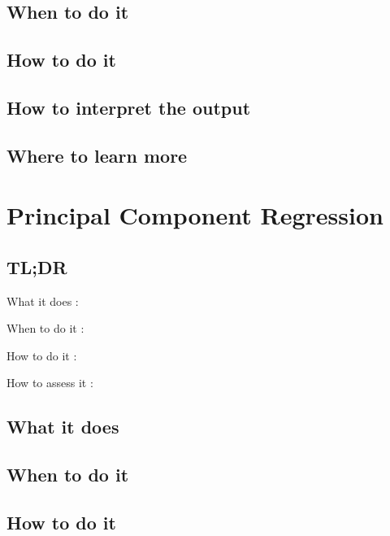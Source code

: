 \documentclass[
]{book}
\begin{document}
\hypertarget{when-to-do-it-14}{%
\section{When to do it}\label{when-to-do-it-14}}

\hypertarget{how-to-do-it-14}{%
\section{How to do it}\label{how-to-do-it-14}}

\hypertarget{how-to-interpret-the-output-14}{%
\section{How to interpret the output}\label{how-to-interpret-the-output-14}}

\hypertarget{where-to-learn-more-14}{%
\section{Where to learn more}\label{where-to-learn-more-14}}

\hypertarget{principal-component-regression}{%
\chapter{Principal Component Regression}\label{principal-component-regression}}

\hypertarget{tldr-15}{%
\section{TL;DR}\label{tldr-15}}

What it does
:

When to do it
:

How to do it
:

How to assess it
:

\hypertarget{what-it-does-15}{%
\section{What it does}\label{what-it-does-15}}

\hypertarget{when-to-do-it-15}{%
\section{When to do it}\label{when-to-do-it-15}}

\hypertarget{how-to-do-it-15}{%
\section{How to do it}\label{how-to-do-it-15}}
\end{document}
